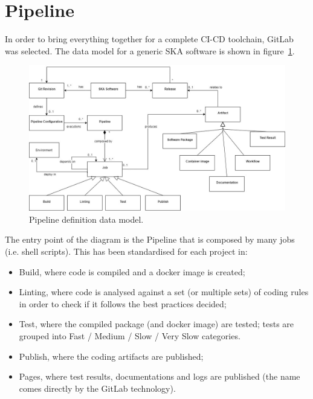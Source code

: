 \documentclass[a4paper]{spie}  %
\begin{document}
\section{Pipeline} \label{pipeline}

In order to bring everything together for a complete CI-CD toolchain, GitLab~\cite{gitlab} was selected. The data model for a generic SKA software is shown in figure~\ref{fig:pipelinedatamodel}.

\begin{figure}[!htb]
   \centering
   \includegraphics*[width=0.8\columnwidth]{dataEntity}
   \caption{Pipeline definition data model.}
   \label{fig:pipelinedatamodel}
\end{figure}

The entry point of the diagram is the Pipeline that is composed by many jobs (i.e. shell scripts). This has been standardised for each project in:
\begin{itemize}
    \item Build, where code is compiled and a docker image is created;
    \item Linting, where code is analysed against a set (or multiple sets) of coding rules in order to check if it follows the best practices decided;
    \item Test, where the compiled package (and docker image) are tested; tests are grouped into Fast / Medium / Slow / Very Slow categories.
    \item Publish, where the coding artifacts are published;
    \item Pages, where test results, documentations and logs are published (the name comes directly by the GitLab technology).
\end{itemize}
\end{document}
